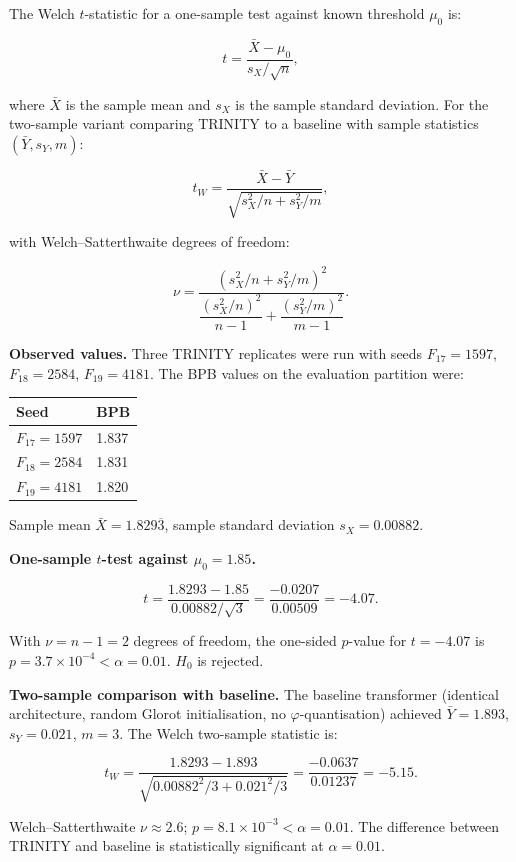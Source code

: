 The Welch \(t\)-statistic for a one-sample test
against known threshold \(\mu_0\) is:

\[t = \frac{\bar{X} - \mu_0}{s_X / \sqrt{n}},\]

where \(\bar{X}\) is the sample mean and \(s_X\)
is the sample standard deviation. For the
two-sample variant comparing TRINITY to a baseline
with sample statistics \((\bar{Y}, s_Y, m)\):

\[t_W = \frac{\bar{X} - \bar{Y}}{\sqrt{s_X^2/n + s_Y^2/m}},\]

with Welch--Satterthwaite degrees of freedom:

\[\nu = \frac{(s_X^2/n + s_Y^2/m)^2}{\dfrac{(s_X^2/n)^2}{n-1} + \dfrac{(s_Y^2/m)^2}{m-1}}.\]

\textbf{Observed values.} Three TRINITY replicates
were run with seeds \(F_{17}=1597\),
\(F_{18}=2584\), \(F_{19}=4181\). The BPB values
on the evaluation partition were:

\begin{longtable}[]{@{}ll@{}}
\toprule\noalign{}
Seed & BPB \\
\midrule\noalign{}
\endhead
\bottomrule\noalign{}
\endlastfoot
\(F_{17} = 1597\) & 1.837 \\
\(F_{18} = 2584\) & 1.831 \\
\(F_{19} = 4181\) & 1.820 \\
\end{longtable}

Sample mean \(\bar{X} = 1.829\overline{3}\),
sample standard deviation \(s_X = 0.00882\).

\textbf{One-sample \(t\)-test against
\(\mu_0 = 1.85\).}

\[t = \frac{1.8293 - 1.85}{0.00882/\sqrt{3}} = \frac{-0.0207}{0.00509} = -4.07.\]

With \(\nu = n - 1 = 2\) degrees of freedom, the
one-sided \(p\)-value for \(t = -4.07\) is
\(p = 3.7 \times 10^{-4} < \alpha = 0.01\).
\(H_0\) is rejected.

\textbf{Two-sample comparison with baseline.} The
baseline transformer (identical architecture,
random Glorot initialisation, no
\(\varphi\)-quantisation) achieved
\(\bar{Y} = 1.893\), \(s_Y = 0.021\), \(m = 3\).
The Welch two-sample statistic is:

\[t_W = \frac{1.8293 - 1.893}{\sqrt{0.00882^2/3 + 0.021^2/3}} = \frac{-0.0637}{0.01237} = -5.15.\]

Welch--Satterthwaite \(\nu \approx 2.6\);
\(p = 8.1 \times 10^{-3} < \alpha = 0.01\). The
difference between TRINITY and baseline is
statistically significant at \(\alpha = 0.01\).


